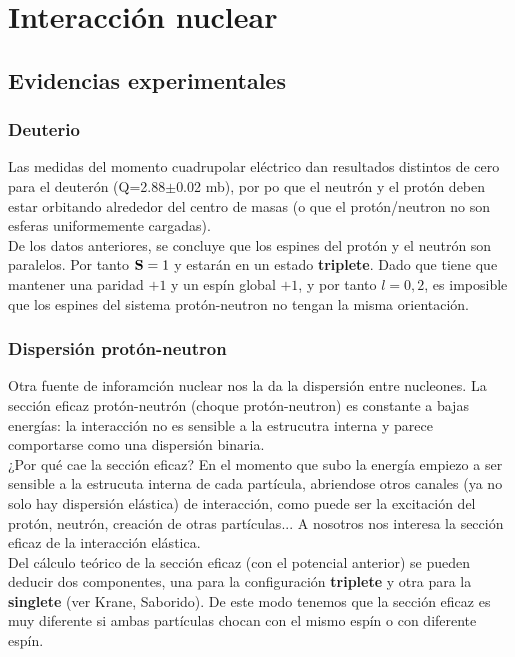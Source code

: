 \chapter{Interacción nuclear}

\section{Evidencias experimentales}

\subsection{Deuterio}

Las medidas del momento cuadrupolar eléctrico dan resultados distintos de cero para el deuterón (Q=2.88$\pm$0.02 mb), por po que el neutrón y el protón deben estar orbitando alrededor del centro de masas (o que el protón/neutron no son esferas uniformemente cargadas). \\

De los datos anteriores, se concluye que los espines del protón y el neutrón son paralelos. Por tanto $\mathbf{S}=1$ y estarán en un estado {\bf triplete}. Dado que tiene que mantener una paridad $+1$ y un espín global $+1$, y por tanto $l=0,2$, es imposible que los espines del sistema protón-neutron no tengan la misma orientación. \\

\subsection{Dispersión protón-neutron}

Otra fuente de inforamción nuclear nos la da la dispersión entre nucleones. La sección eficaz protón-neutrón (choque protón-neutron) es constante a bajas energías: la interacción no es sensible a la estrucutra interna y parece comportarse como una dispersión binaria. \\

¿Por qué cae la sección eficaz? En el momento que subo la energía empiezo a ser sensible a la estrucuta interna de cada partícula, abriendose otros canales (ya no solo hay dispersión elástica) de interacción, como puede ser la excitación del protón, neutrón, creación de otras partículas... A nosotros nos interesa la sección eficaz de la interacción elástica. \\

Del cálculo teórico de la sección eficaz (con el potencial anterior) se pueden deducir dos componentes, una para la configuración {\bf triplete} y otra para la {\bf singlete} (ver Krane, Saborido). De este modo tenemos que la sección eficaz es muy diferente si ambas partículas chocan con el mismo espín o con diferente espín.  \\

